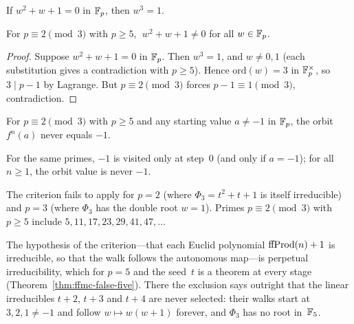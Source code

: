 \begin{lemma}
If $w^2+w+1 = 0$ in $\mathbb{F}_p$, then $w^3 = 1$.
\end{lemma}

\begin{theorem}
\label{thm:phi3-no-roots}
For $p \equiv 2 \pmod 3$ with $p \geq 5$, $\;w^2 + w + 1 \neq 0$ for all
$w \in \mathbb{F}_p$.
\end{theorem}

\begin{proof}
Suppose $w^2+w+1 = 0$ in $\mathbb{F}_p$.  Then $w^3 = 1$, and $w \neq 0,1$ (each
substitution gives a contradiction with $p \geq 5$).  Hence $\mathrm{ord}(w) = 3$
in $\mathbb{F}_p^\times$, so $3 \mid p-1$ by Lagrange.  But $p \equiv 2 \pmod 3$
forces $p - 1 \equiv 1 \pmod 3$, contradiction.
\end{proof}

\begin{theorem}
\label{thm:ff-unreach}
For $p \equiv 2 \pmod 3$ with $p \geq 5$ and any starting value
$a \neq -1$ in $\mathbb{F}_p$, the orbit $f^n(a)$ never equals $-1$.
\end{theorem}

\begin{corollary}
For the same primes, $-1$ is visited only at step~$0$ (and only if
$a = -1$); for all $n \geq 1$, the orbit value is never $-1$.
\end{corollary}

\begin{remark}
The criterion fails to apply for $p = 2$ (where $\Phi_3 = t^2+t+1$ is
itself irreducible) and $p = 3$ (where $\Phi_3$ has the double root
$w = 1$).  Primes $p \equiv 2 \pmod 3$ with $p \geq 5$ include
$5, 11, 17, 23, 29, 41, 47, \dots$
\end{remark}

\begin{remark}[The criterion is unconditional for $p = 5$]
The hypothesis of the criterion---that each Euclid polynomial
$\mathrm{ffProd}(n)+1$ is irreducible, so that the walk follows the autonomous
map---is perpetual irreducibility, which for $p = 5$ and the
seed~$t$ is a theorem at every stage (Theorem~\ref{thm:ffmc-false-five}).
There the exclusion says outright that the linear irreducibles $t+2$,
$t+3$ and $t+4$ are never selected: their walks start at $3, 2, 1 \neq -1$ and follow
$w \mapsto w(w+1)$ forever, and $\Phi_3$ has no root in~$\mathbb{F}_5$.
\end{remark}

